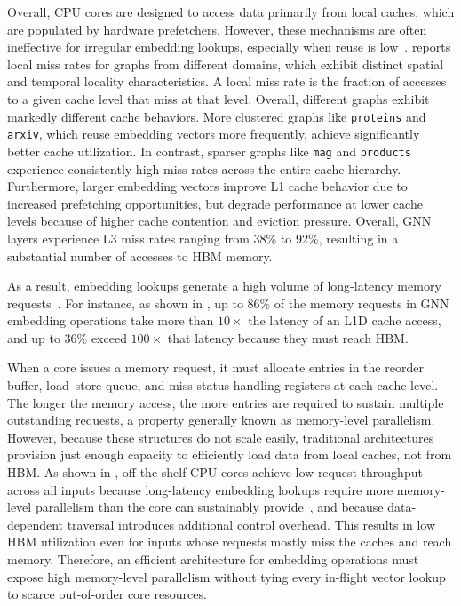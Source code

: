 

Overall, CPU cores are designed to access data primarily from local caches, which are populated by hardware prefetchers. However, these mechanisms are often ineffective for irregular embedding lookups, especially when reuse is low~\cite{gupta2020hpca}.  reports local miss rates for graphs from different domains, which exhibit distinct spatial and temporal locality characteristics. A local miss rate is the fraction of accesses to a given cache level that miss at that level. Overall, different graphs exhibit markedly different cache behaviors. More clustered graphs like \texttt{proteins} and \texttt{arxiv}, which reuse embedding vectors more frequently, achieve significantly better cache utilization. In contrast, sparser graphs like \texttt{mag} and \texttt{products} experience consistently high miss rates across the entire cache hierarchy. Furthermore, larger embedding vectors improve L1 cache behavior due to increased prefetching opportunities, but degrade performance at lower cache levels because of higher cache contention and eviction pressure. Overall, GNN layers experience L3 miss rates ranging from 38\% to 92\%, resulting in a substantial number of accesses to HBM memory.



As a result, embedding lookups generate a high volume of long-latency memory requests~\cite{esmailidokht2024micro}. For instance, as shown in , up to 86\% of the memory requests in GNN embedding operations take more than $10\times$ the latency of an L1D cache access, and up to 36\% exceed $100\times$ that latency because they must reach HBM.

When a core issues a memory request, it must allocate entries in the reorder buffer, load--store queue, and miss-status handling registers at each cache level. The longer the memory access, the more entries are required to sustain multiple outstanding requests, a property generally known as memory-level parallelism. However, because these structures do not scale easily, traditional architectures provision just enough capacity to efficiently load data from local caches, not from HBM. As shown in , off-the-shelf CPU cores achieve low request throughput across all inputs because long-latency embedding lookups require more memory-level parallelism than the core can sustainably provide~\cite{esmailidokht2024micro}, and because data-dependent traversal introduces additional control overhead. This results in low HBM utilization even for inputs whose requests mostly miss the caches and reach memory. Therefore, an efficient architecture for embedding operations must expose high memory-level parallelism without tying every in-flight vector lookup to scarce out-of-order core resources.

